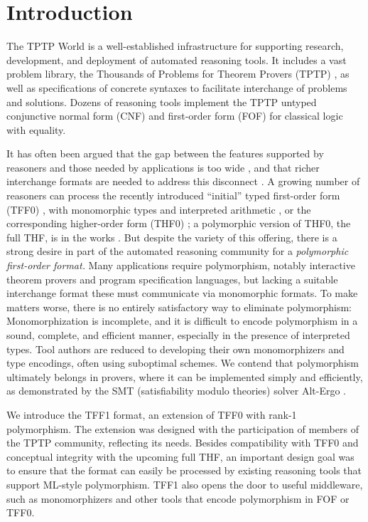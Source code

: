 \section{Introduction}
\label{sec_intro}

The TPTP World \cite{sutcliffe-2010-world} is a well-established infrastructure
for supporting research, development, and deployment of automated reasoning
tools. It includes a vast problem library, the Thousands of Problems for Theorem
Provers (TPTP) \cite{sutcliffe-2009-lib}, as well as specifications of concrete
syntaxes to facilitate interchange of problems and solutions.
Dozens of reasoning tools implement the TPTP untyped conjunctive normal form
(CNF) and first-order form (FOF) for classical logic with equality.

It has often been argued that the gap between the features supported by
reasoners and those needed by applications is too wide
\cite{stickel-2009,voronkov-2003}, and that richer interchange formats are
needed to address this disconnect \cite{kuncak-2011}.
A growing number of reasoners can process the
recently introduced ``initial'' typed first-order form (TFF0) \cite{sutcliffe-et-al-2012-tff0},
with monomorphic types and interpreted arithmetic \cite{SPASS-T,vampire-arith},
or the corresponding higher-order form (THF0) \cite{benzmueller-et-al-2008-thf0};
a polymorphic version of THF0, the full THF, is in the works
\cite{sutcliffe-benzmueller-2010}.
%
But despite the variety of this offering, there is a strong desire in part of the automated
reasoning community for a \emph{polymorphic first-order format.} Many applications
require polymorphism, notably interactive theorem provers and program
specification languages, but lacking a suitable interchange format these
must communicate via monomorphic formats. To make matters worse, there is no entirely
satisfactory way to eliminate polymorphism: Monomorphization is %
incomplete, and it is difficult to encode polymorphism in a sound, complete, and
efficient manner, especially in the presence of interpreted types. Tool authors
are reduced to developing their own monomorphizers and type encodings, often
using suboptimal schemes. We contend that polymorphism ultimately belongs in
provers, where it can be implemented simply and efficiently, as demonstrated by
the SMT (satisfiability modulo theories) solver Alt-Ergo \cite{bobot-et-al-2008}.

We introduce the TFF1
format, an extension of TFF0 with rank-1 polymorphism. The
extension was designed with the participation of members of the TPTP community,
reflecting its needs.
Besides compatibility with TFF0 and conceptual integrity with the upcoming full
THF, an important design goal was to ensure that the format can easily be
processed by existing reasoning tools that support ML-style polymorphism. TFF1
also opens the door to useful middleware, such as monomorphizers and other
tools that encode polymorphism in FOF or TFF0.

